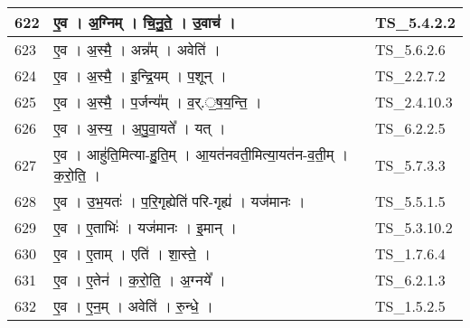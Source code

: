\documentclass[17pt]{extarticle}
\begin{document}
\begin{longtable}{||p{0.4in}||p{4.9in}||p{0.9in}||}
    \hline
        
    622 & ए॒व   ।   अ॒ग्निम्   ।   चि॒नु॒ते॒   ।   उ॒वाच॑   ।    & TS\_5.4.2.2       \\
    
    \hline
        
    623 & ए॒व   ।   अ॒स्मै॒   ।   अन्न᳚म्   ।   अवेति॑   ।    & TS\_5.6.2.6       \\
    
    \hline
        
    624 & ए॒व   ।   अ॒स्मै॒   ।   इ॒न्द्रि॒यम्   ।   प॒शून्   ।    & TS\_2.2.7.2       \\
    
    \hline
        
    625 & ए॒व   ।   अ॒स्मै॒   ।   प॒र्जन्य᳚म्   ।   व॒र्.॒ष॒य॒न्ति॒   ।    & TS\_2.4.10.3       \\
    
    \hline
        
    626 & ए॒व   ।   अ॒स्य॒   ।   अ॒पु॒वा॒यते᳚   ।   यत्   ।    & TS\_6.2.2.5       \\
    
    \hline
        
    627 & ए॒व   ।   आहु॑ति॒मित्या{-}हु॒ति॒म्   ।   आ॒यत॑नवती॒मित्या॒यत॑न{-}व॒ती॒म्   ।   क॒रो॒ति॒   ।    & TS\_5.7.3.3       \\
    
    \hline
        
    628 & ए॒व   ।   उ॒भ॒यतः॑   ।   प॒रि॒गृह्येति॑ परि{-}गृह्य॑   ।   यज॑मानः   ।    & TS\_5.5.1.5       \\
    
    \hline
        
    629 & ए॒व   ।   ए॒ताभिः॑   ।   यज॑मानः   ।   इ॒मान्   ।    & TS\_5.3.10.2       \\
    
    \hline
        
    630 & ए॒व   ।   ए॒ताम्   ।   एति॑   ।   शा॒स्ते॒   ।    & TS\_1.7.6.4       \\
    
    \hline
        
    631 & ए॒व   ।   ए॒तेन॑   ।   क॒रो॒ति॒   ।   अ॒ग्नये᳚   ।    & TS\_6.2.1.3       \\
    
    \hline
        
    632 & ए॒व   ।   ए॒न॒म्   ।   अवेति॑   ।   रु॒न्धे॒   ।    & TS\_1.5.2.5       \\
    

\end{longtable}
\end{document}
